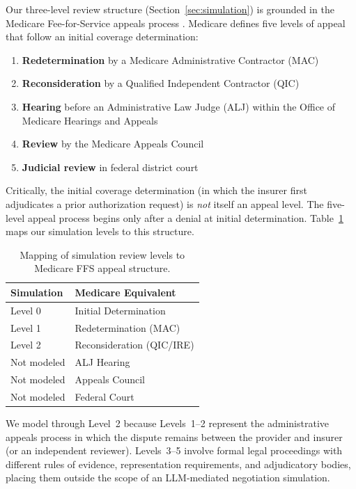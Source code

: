 Our three-level review structure (Section~\ref{sec:simulation}) is grounded in the Medicare Fee-for-Service appeals process \citep{cms2024appeals}. Medicare defines five levels of appeal that follow an initial coverage determination:

\begin{enumerate}
    \item \textbf{Redetermination} by a Medicare Administrative Contractor (MAC)
    \item \textbf{Reconsideration} by a Qualified Independent Contractor (QIC)
    \item \textbf{Hearing} before an Administrative Law Judge (ALJ) within the Office of Medicare Hearings and Appeals
    \item \textbf{Review} by the Medicare Appeals Council
    \item \textbf{Judicial review} in federal district court
\end{enumerate}

Critically, the initial coverage determination (in which the insurer first adjudicates a prior authorization request) is \emph{not} itself an appeal level. The five-level appeal process begins only after a denial at initial determination. Table~\ref{tab:level-mapping} maps our simulation levels to this structure.

\begin{table}[h]
\centering
\caption{Mapping of simulation review levels to Medicare FFS appeal structure.}
\label{tab:level-mapping}
\begin{tabular}{ll}
\toprule
\textbf{Simulation} & \textbf{Medicare Equivalent} \\
\midrule
Level 0 & Initial Determination \\
Level 1 & Redetermination (MAC) \\
Level 2 & Reconsideration (QIC/IRE) \\
\midrule
Not modeled & ALJ Hearing \\
Not modeled & Appeals Council \\
Not modeled & Federal Court \\
\bottomrule
\end{tabular}
\end{table}

We model through Level~2 because Levels~1--2 represent the administrative appeals process in which the dispute remains between the provider and insurer (or an independent reviewer). Levels~3--5 involve formal legal proceedings with different rules of evidence, representation requirements, and adjudicatory bodies, placing them outside the scope of an LLM-mediated negotiation simulation.

